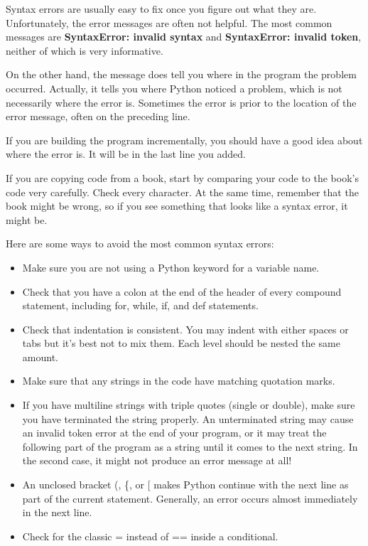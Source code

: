 \documentclass[11pt]{article}
\providecommand{\tightlist}{%
      \setlength{\itemsep}{0pt}\setlength{\parskip}{0pt}}
\begin{document}
Syntax errors are usually easy to fix once you figure out what they are.
Unfortunately, the error messages are often not helpful. The most common
messages are \textbf{SyntaxError: invalid syntax} and
\textbf{SyntaxError: invalid token}, neither of which is very
informative.

On the other hand, the message does tell you where in the program the
problem occurred. Actually, it tells you where Python noticed a problem,
which is not necessarily where the error is. Sometimes the error is
prior to the location of the error message, often on the preceding line.

If you are building the program incrementally, you should have a good
idea about where the error is. It will be in the last line you added.

If you are copying code from a book, start by comparing your code to the
book's code very carefully. Check every character. At the same time,
remember that the book might be wrong, so if you see something that
looks like a syntax error, it might be.

Here are some ways to avoid the most common syntax errors:

\begin{itemize}
\tightlist
\item
  Make sure you are not using a Python keyword for a variable name.
\item
  Check that you have a colon at the end of the header of every compound
  statement, including for, while, if, and def statements.
\item
  Check that indentation is consistent. You may indent with either
  spaces or tabs but it's best not to mix them. Each level should be
  nested the same amount.
\item
  Make sure that any strings in the code have matching quotation marks.
\item
  If you have multiline strings with triple quotes (single or double),
  make sure you have terminated the string properly. An unterminated
  string may cause an invalid token error at the end of your program, or
  it may treat the following part of the program as a string until it
  comes to the next string. In the second case, it might not produce an
  error message at all!
\item
  An unclosed bracket (, \{, or {[} makes Python continue with the next
  line as part of the current statement. Generally, an error occurs
  almost immediately in the next line.
\item
  Check for the classic = instead of == inside a conditional.
\end{itemize}
\end{document}
